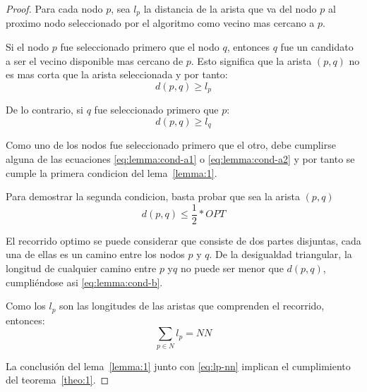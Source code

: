 \documentclass[spanish]{llncs}
\begin{document}
\begin{proof}
	Para cada nodo $p$, sea $l_p$ la distancia de la arista que va del nodo $p$
	al proximo nodo seleccionado por el algoritmo como vecino mas cercano a $p$.

	Si el nodo $p$ fue seleccionado primero que el nodo $q$, entonces $q$ fue un
	candidato a ser el vecino disponible mas cercano de $p$. Esto significa que la
	arista $(p,q)$ no es mas corta que la arista seleccionada y por tanto:
	\begin{equation}
		\label{eq:lemma:cond-a1}
		d(p,q) \ge l_p
	\end{equation}
	
	De lo contrario, si $q$ fue seleccionado primero que $p$:
	\begin{equation}
		\label{eq:lemma:cond-a2}
		d(p,q) \ge l_q
	\end{equation}
	
	Como uno de los nodos fue seleccionado primero que el otro, debe cumplirse alguna de
	las ecuaciones \eqref{eq:lemma:cond-a1} o \eqref{eq:lemma:cond-a2} y por tanto se cumple
	la primera condicion del lema~\ref{lemma:1}.

	Para demostrar la segunda condicion, basta probar que sea la arista $(p,q)$
	\begin{equation}
		\label{eq:lemma:cond-b}
		d(p,q) \le \frac{1}{2}*OPT
	\end{equation}
	
	El recorrido optimo se puede considerar que consiste de dos partes disjuntas, cada una de
	ellas es un camino entre los nodos $p$ y $q$. De la desigualdad triangular, la longitud
	de cualquier camino entre $p$ y$q$ no puede ser menor que $d(p,q)$, cumpliéndose asi
	\eqref{eq:lemma:cond-b}.

	Como los $l_p$ son las longitudes de las aristas que comprenden el recorrido,
	entonces:
	\begin{equation}
		\label{eq:lp-nn}
		\sum_{p \in N} l_p = NN
	\end{equation}

	La conclusión del lema~\ref{lemma:1} junto con \eqref{eq:lp-nn} implican el cumplimiento del
	teorema~\ref{theo:1}.
\end{proof}
\end{document}
